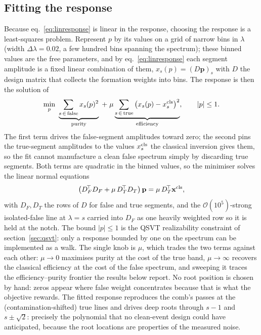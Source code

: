 \documentclass[11pt,a4paper]{article}
\begin{document}
\subsection{Fitting the response}

Because eq.~\eqref{eq:linresponse} is linear in the response,
choosing the response is a least-squares problem. Represent $p$ by
its values on a grid of narrow bins in $\lambda$ (width
$\Delta\lambda=0.02$, a few hundred bins spanning the spectrum);
these binned values are the free parameters, and by
eq.~\eqref{eq:linresponse} each segment amplitude is a fixed linear
combination of them, $x_s(p)=(D\mathbf{p})_s$ with $D$ the design
matrix that collects the formation weights into bins. The response
is then the solution of
\begin{equation}
\min_{p}\ \underbrace{\sum_{s\,\in\,\rm false}x_s(p)^2}_{\text{purity}}
\;+\;\mu\underbrace{\sum_{s\,\in\,\rm true}
\big(x_s(p)-x_s^{\rm cls}\big)^2}_{\text{efficiency}} ,
\qquad |p|\le1 .
\label{eq:fit}
\end{equation}
The first term drives the false-segment amplitudes toward zero; the
second pins the true-segment amplitudes to the values
$x_s^{\rm cls}$ the classical inversion gives them, so the fit
cannot manufacture a clean false spectrum simply by discarding true
segments. Both terms are quadratic in the binned values, so the
minimiser solves the linear normal equations
\begin{equation}
\big(D_F^{\!\top}D_F+\mu\,D_T^{\!\top}D_T\big)\,\mathbf{p}
=\mu\,D_T^{\!\top}\mathbf{x}^{\rm cls},
\label{eq:normal}
\end{equation}
with $D_F,D_T$ the rows of $D$ for false and true segments, and the
$\mathcal{O}(10^5)$-strong isolated-false line at $\lambda=s$
carried into $D_F$ as one heavily weighted row so it is held at the
notch. The bound $|p|\le1$ is the QSVT realizability constraint of
section~\ref{sec:qsvt}: only a response bounded by one on the
spectrum can be implemented as a walk. The single knob is $\mu$,
which trades the two terms against each other: $\mu\to0$ maximises
purity at the cost of the true band, $\mu\to\infty$ recovers the
classical efficiency at the cost of the false spectrum, and sweeping
it traces the efficiency--purity frontier the results below report.
No root position is chosen by hand: zeros appear where false weight
concentrates because that is what the objective rewards. The fitted
response reproduces the comb's passes at the (contamination-shifted)
true lines and drives deep roots through $s-1$ and $s\pm\sqrt2$:
precisely the polynomial that no clean-event design could have
anticipated, because the root locations are properties of the
measured noise.
\end{document}
